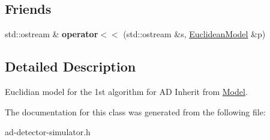 \subsection*{Friends}
\begin{DoxyCompactItemize}
\item 
\hypertarget{classns3_1_1EuclideanModel_ac933d15ad4b493f033e627ac7c7b6157}{}std\+::ostream \& {\bfseries operator$<$$<$} (std\+::ostream \&s, \hyperlink{classns3_1_1EuclideanModel}{Euclidean\+Model} \&p)\label{classns3_1_1EuclideanModel_ac933d15ad4b493f033e627ac7c7b6157}

\end{DoxyCompactItemize}


\subsection{Detailed Description}
Euclidian model for the 1st algorithm for A\+D Inherit from \hyperlink{classns3_1_1Model}{Model}. 

The documentation for this class was generated from the following file\+:\begin{DoxyCompactItemize}
\item 
ad-\/detector-\/simulator.\+h\end{DoxyCompactItemize}
